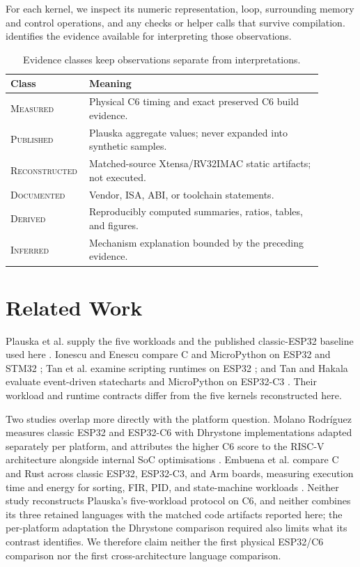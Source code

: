 \documentclass[10pt]{article}
\newcommand{\eclass}[1]{\textsc{#1}}
\begin{document}
For each kernel, we inspect its numeric representation, loop, surrounding memory and control operations, and any checks or helper calls that survive compilation.  identifies the evidence available for interpreting those observations.

\begin{table}[!htbp]
\centering\small
\caption{Evidence classes keep observations separate from interpretations.}
\label{tab:evidence}
\begin{tabular}{@{}p{0.17\linewidth}p{0.72\linewidth}@{}}
\toprule Class & Meaning \\ \midrule
\eclass{Measured} & Physical C6 timing and exact preserved C6 build evidence.\\
\eclass{Published} & Plauska aggregate values; never expanded into synthetic samples.\\
\eclass{Reconstructed} & Matched-source Xtensa/RV32IMAC static artifacts; not executed.\\
\eclass{Documented} & Vendor, ISA, ABI, or toolchain statements.\\
\eclass{Derived} & Reproducibly computed summaries, ratios, tables, and figures.\\
\eclass{Inferred} & Mechanism explanation bounded by the preceding evidence.\\
\bottomrule
\end{tabular}
\end{table}

\section{Related Work}
Plauska et al. supply the five workloads and the published classic-ESP32 baseline used here \citep{plauska2023performance}. Ionescu and Enescu compare C and MicroPython on ESP32 and STM32 \citep{ionescu2020micropythonc}; Tan et al. examine scripting runtimes on ESP32 \citep{tan2025scripting}; and Tan and Hakala evaluate event-driven statecharts and MicroPython on ESP32-C3 \citep{tan2026eventdriven}. Their workload and runtime contracts differ from the five kernels reconstructed here.

Two studies overlap more directly with the platform question. Molano Rodr\'iguez measures classic ESP32 and ESP32-C6 with Dhrystone implementations adapted separately per platform, and attributes the higher C6 score to the RISC-V architecture alongside internal SoC optimisations \citep{molano2025riscvfpga}. Embuena et al. compare C and Rust across classic ESP32, ESP32-C3, and Arm boards, measuring execution time and energy for sorting, FIR, PID, and state-machine workloads \citep{embuena2026platforms}. Neither study reconstructs Plauska's five-workload protocol on C6, and neither combines its three retained languages with the matched code artifacts reported here; the per-platform adaptation the Dhrystone comparison required also limits what its contrast identifies. We therefore claim neither the first physical ESP32/C6 comparison nor the first cross-architecture language comparison.
\end{document}
